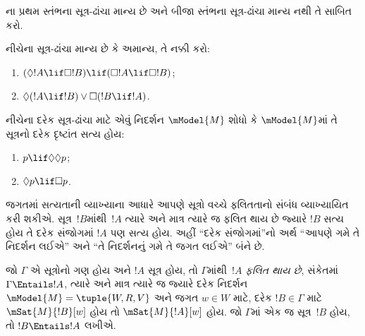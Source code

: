 \begin{prob}%
  ના
  પ્રથમ સ્તંભના સૂત્ર-ઢાંચા માન્ય છે અને બીજા સ્તંભના
  સૂત્ર-ઢાંચા માન્ય નથી તે સાબિત કરો.
\end{prob}

\begin{prob}
  નીચેના સૂત્ર-ઢાંચા માન્ય છે કે અમાન્ય, તે નક્કી કરો:
  \begin{enumerate}
  \item $(\Diamond !A \lif \Box !B) \lif (\Box !A \lif \Box
    !B)$;
  \item $\Diamond(!A \lif !B) \lor \Box(!B \lif !A)$.
  \end{enumerate}
\end{prob}

\begin{prob}
  નીચેના દરેક સૂત્ર-ઢાંચા માટે એવું નિદર્શન $\mModel{M}$
  શોધો કે $\mModel{M}$માં તે સૂત્રનો દરેક દૃષ્ટાંત સત્ય હોય:
  \begin{enumerate}
  \item $p \lif \Diamond\Diamond p$;
  \item $\Diamond p \lif \Box p$.
  \end{enumerate}
\end{prob}
\endgroup

\begingroup
\makeatletter{}\makeatother


\label{guunit:OLP-0418}


\begin{explain}
  જગતમાં સત્યતાની વ્યાખ્યાના આધારે આપણે
  સૂત્રો વચ્ચે ફલિતતાનો સંબંધ વ્યાખ્યાયિત કરી
  શકીએ. સૂત્ર~$!B$માંથી~$!A$ ત્યારે અને માત્ર
  ત્યારે જ ફલિત થાય છે જ્યારે $!B$ સત્ય હોય તે દરેક
  સંજોગમાં $!A$ પણ સત્ય હોય. અહીં ``દરેક સંજોગમાં''નો
  અર્થ ``આપણે ગમે તે નિદર્શન લઈએ'' અને ``તે
  નિદર્શનનું ગમે તે જગત લઈએ'' બંને છે.
\end{explain}

\begin{defn}
  જો $\Gamma$ એ સૂત્રોનો ગણ હોય અને $!A$
  સૂત્ર હોય, તો $\Gamma$માંથી~$!A$
  \emph{ફલિત થાય છે}, સંકેતમાં $\Gamma \Entails !A$,
  ત્યારે અને માત્ર ત્યારે જ જ્યારે દરેક નિદર્શન
  $\mModel{M} = \tuple{W, R, V}$ અને જગત $w \in W$
  માટે, દરેક $!B \in \Gamma$ માટે $\mSat{M}{!B}[w]$
  હોય તો $\mSat{M}{!A}[w]$ હોય. જો $\Gamma$માં એક જ
  સૂત્ર~$!B$ હોય, તો $!B \Entails !A$ લખીએ.
\end{defn}

